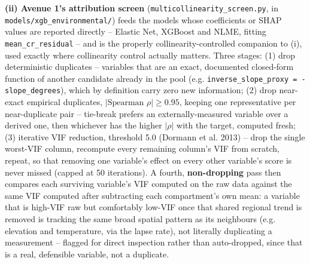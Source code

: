\documentclass[11pt,a4paper]{report}
\begin{document}
\textbf{(ii) Avenue 1's attribution screen} (\texttt{multicollinearity\_screen.py}, in
\texttt{models/xgb\_environmental/}) feeds the models whose coefficients or SHAP values are
reported directly -- Elastic Net, XGBoost and NLME, fitting \texttt{mean\_cr\_residual} -- and is
the properly collinearity-controlled companion to (i), used exactly where collinearity control
actually matters. Three stages: (1) drop deterministic duplicates -- variables that are an exact,
documented closed-form function of another candidate already in the pool (e.g.
\texttt{inverse\_slope\_proxy = -slope\_degrees}), which by definition carry zero new information;
(2) drop near-exact empirical duplicates, $|\text{Spearman }\rho|\ge 0.95$, keeping one
representative per near-duplicate pair -- tie-break prefers an externally-measured variable over a
derived one, then whichever has the higher $|\rho|$ with the target, computed fresh; (3) iterative
VIF reduction, threshold 5.0 (Dormann et al. 2013) -- drop the single worst-VIF column, recompute
every remaining column's VIF from scratch, repeat, so that removing one variable's effect on every
other variable's score is never missed (capped at 50 iterations). A fourth, \textbf{non-dropping}
pass then compares each surviving variable's VIF computed on the raw data against the same VIF
computed after subtracting each compartment's own mean: a variable that is high-VIF raw but
comfortably low-VIF once that shared regional trend is removed is tracking the same broad spatial
pattern as its neighbours (e.g. elevation and temperature, via the lapse rate), not literally
duplicating a measurement -- flagged for direct inspection rather than auto-dropped, since that is
a real, defensible variable, not a duplicate.
\end{document}
